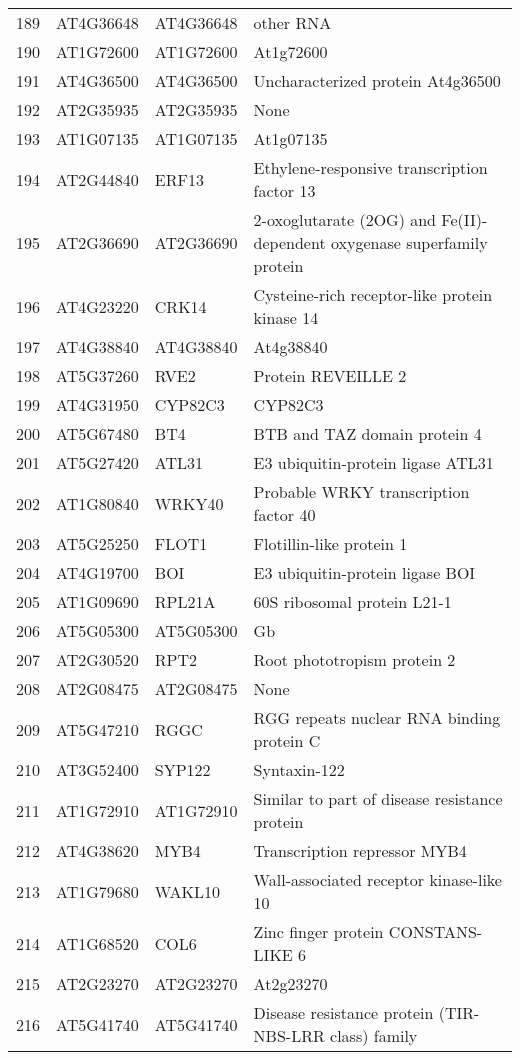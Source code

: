 \documentclass[a4paper]{article}
\begin{document}
\begin{center}
\begin{tabular}{rlll}
189 & AT4G36648 & AT4G36648 & other RNA\\
190 & AT1G72600 & AT1G72600 & At1g72600\\
191 & AT4G36500 & AT4G36500 & Uncharacterized protein At4g36500\\
192 & AT2G35935 & AT2G35935 & None\\
193 & AT1G07135 & AT1G07135 & At1g07135\\
194 & AT2G44840 & ERF13 & Ethylene-responsive transcription factor 13\\
195 & AT2G36690 & AT2G36690 & 2-oxoglutarate (2OG) and Fe(II)-dependent oxygenase superfamily protein\\
196 & AT4G23220 & CRK14 & Cysteine-rich receptor-like protein kinase 14\\
197 & AT4G38840 & AT4G38840 & At4g38840\\
198 & AT5G37260 & RVE2 & Protein REVEILLE 2\\
199 & AT4G31950 & CYP82C3 & CYP82C3\\
200 & AT5G67480 & BT4 & BTB and TAZ domain protein 4\\
201 & AT5G27420 & ATL31 & E3 ubiquitin-protein ligase ATL31\\
202 & AT1G80840 & WRKY40 & Probable WRKY transcription factor 40\\
203 & AT5G25250 & FLOT1 & Flotillin-like protein 1\\
204 & AT4G19700 & BOI & E3 ubiquitin-protein ligase BOI\\
205 & AT1G09690 & RPL21A & 60S ribosomal protein L21-1\\
206 & AT5G05300 & AT5G05300 & Gb\\
207 & AT2G30520 & RPT2 & Root phototropism protein 2\\
208 & AT2G08475 & AT2G08475 & None\\
209 & AT5G47210 & RGGC & RGG repeats nuclear RNA binding protein C\\
210 & AT3G52400 & SYP122 & Syntaxin-122\\
211 & AT1G72910 & AT1G72910 & Similar to part of disease resistance protein\\
212 & AT4G38620 & MYB4 & Transcription repressor MYB4\\
213 & AT1G79680 & WAKL10 & Wall-associated receptor kinase-like 10\\
214 & AT1G68520 & COL6 & Zinc finger protein CONSTANS-LIKE 6\\
215 & AT2G23270 & AT2G23270 & At2g23270\\
216 & AT5G41740 & AT5G41740 & Disease resistance protein (TIR-NBS-LRR class) family\\

\end{tabular}
\end{center}
\end{document}

